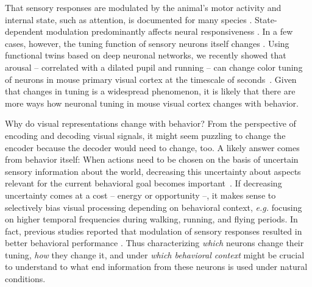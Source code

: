 \documentclass[COG,11pt]{ercgrant}
\begin{document}
That sensory responses are modulated by the animal's motor activity and internal state, such as attention, is documented for many species \parencite{Rowell1971-zj, Wiersma1968-xt, Maimon2010-sa, Niell2010-bs,Bezdudnaya2006-ge, Treue1996-lp, Musall2019-kd}.
State-dependent modulation predominantly affects neural responsiveness \parencite{Eggermann2014-xp, Niell2010-bs, McAdams1999-cs,Schroder2020-jl, Dadarlat2017-jw, Mineault2016-fk}. 
In a few cases, however, the tuning function of sensory neurons itself changes \parencite{Chiappe2010-bm, Bezdudnaya2006-ge, Andermann2011-vw, Treue1996-lp}. 
Using functional twins based on deep neuronal networks, we recently showed that arousal -- correlated with a dilated pupil and running -- can change color tuning of neurons in mouse primary visual cortex at the timescale of seconds~\parencite{Franke2022-do}. 
Given that changes in tuning is a widespread phenomenon, it is likely that there are more ways how neuronal tuning in mouse visual cortex changes with behavior. 

Why do visual representations change with behavior? 
From the perspective of encoding and decoding visual signals, it might seem puzzling to change the encoder because the decoder would need to change, too. 
A likely answer comes from behavior itself:
When actions need to be chosen on the basis of uncertain sensory information about the world, decreasing this uncertainty about aspects relevant for the current behavioral goal becomes important~\parencite{Chebolu2022-tb}. 
If decreasing uncertainty comes at a cost -- energy or opportunity --, it makes sense to selectively bias visual processing depending on behavioral context, \textit{e.g.} focusing on  higher temporal frequencies during walking, running, and flying periods.
In fact, previous studies reported that modulation of sensory responses resulted in better behavioral performance \parencite{Spitzer1988-kq, Bennett2013-rk, Dadarlat2017-jw, De_Gee2022-ir}.
Thus characterizing \textit{which} neurons change their tuning, \textit{how} they change it, and under \textit{which behavioral context} might be crucial to understand to what end information from these neurons is used under natural conditions.
\end{document}
